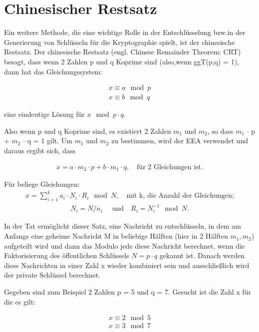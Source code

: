 \section{Chinesischer Restsatz}

Ein weitere Methode, die eine wichtige Rolle in der
Entschlüsselung bzw.in der Generierung von Schlüsseln für die
Kryptographie spielt, ist der chinesische Restsatz.
Der chinesische Restsatz (engl. Chinese Remainder Theorem: CRT) besagt, dass wenn 2 Zahlen p und q Koprime
sind (also,wenn ggT(p,q) = 1), dann hat das Gleichungssystem:

\begin{ceqn}
\begin{align*}
      x \equiv a \mod p \\
      x \equiv b \mod q 
\end{align*}
\end{ceqn}
eine eindeutige Lösung für \(x \mod p \cdot q \). 

Also wenn p und q Koprime sind, es existiert 2 Zahlen $ m_1 $ und $ m_2 $, so dass $ m_1 $ $\cdot$ p + $ m_2 $ $\cdot $ q = 1 gilt. Um $ m_1 $ und  $ m_2 $ zu bestimmen, wird der EEA verwendet und daraus ergibt sich, dass

\begin{ceqn}
   \begin{align*}
       x = a \cdot m_2 \cdot p + b \cdot m_1 \cdot q, \quad \text{für 2 Gleichungen ist.}
   \end{align*}
\end{ceqn}
Für beliege Gleichungen:
\begin{align}
     x = \sum_{i=1}^{k} a_i \cdot N_i \cdot R_i \mod N, \quad \text{mit k, die Anzahl der Gleichungen;}
     \label{crt}
\end{align}
\begin{align*}
     N_i = N/n_i \quad \text{ und} \quad R_i = N_i^{-1} \mod N.
\end{align*}

In der Tat ermöglicht dieser Satz, eine Nachricht zu entschlüsseln, in dem am Anfangs eine geheime Nachricht M in
beliebige Hälften (hier in 2 Hälften $ m_1, m_2 $) aufgeteilt wird und dann das Modulo jede diese Nachricht berechnet, wenn die Faktorisierung des
öffentlichen Schlüssels $ N = p \cdot q $ gekannt ist. Danach
werden diese Nachrichten in einer Zahl x wieder kombiniert sein und ausschließlich wird der private Schlüssel berechnet.


Gegeben sind zum Beispiel 2 Zahlen p = 5 und q = 7. Gesucht ist die Zahl x für die es gilt:
\begin{ceqn}
\begin{align*}
      x \equiv 2 \mod 5 \\
      x \equiv 3 \mod 7 
\end{align*}
\end{ceqn}


